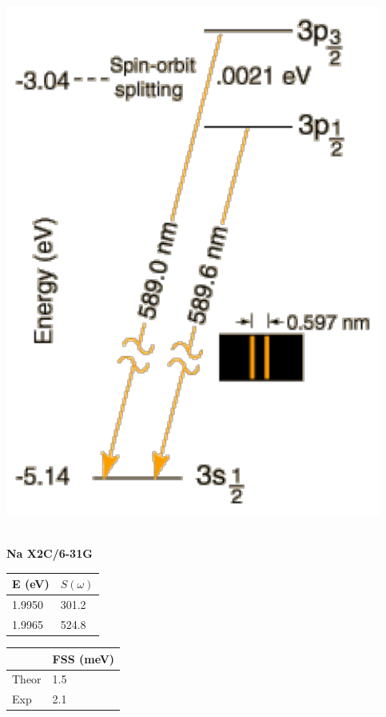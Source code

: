 \documentclass{beamer}
\begin{document}
\begin{frame}
\begin{minipage}[h!]{0.50\textwidth}
\begin{minipage}[h!]{0.5\textwidth}
\includegraphics[width=\textwidth]{Nadoub}
\end{minipage}
\begin{minipage}[h!]{0.47\textwidth}

\small
~\\
\textbf{Na X2C/6-31G}
\vspace{-0.5cm}
\begin{table}
\begin{tabular}{|l|l|}
\hline
E (eV) & $S(\omega)$ \\
\hline
\hline
1.9950 & 301.2\\
1.9965 & 524.8\\
\hline
\end{tabular}
\end{table}
\vspace{-0.5cm}
\begin{table}
\begin{tabular}{|l|l|}
\hline
 & FSS (meV) \\
\hline
\hline
Theor & 1.5\\
Exp & 2.1\\
\hline
\end{tabular}
\end{table}
\end{minipage}

\end{minipage}
\end{frame}
\end{document}
